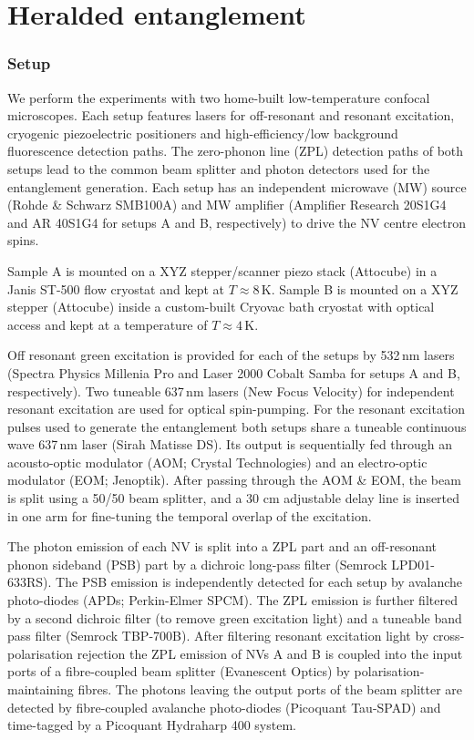 

\graphicspath{{./ch_LDE_SI/figures/}}

\chapter{Heralded entanglement}



\subsection{Setup}
We perform the experiments with two home-built low-temperature confocal microscopes. Each setup features lasers for off-resonant and resonant excitation, cryogenic piezoelectric positioners and high-efficiency/low background fluorescence detection paths. The zero-phonon line (ZPL) detection paths of both setups lead to the common beam splitter and photon detectors used for the entanglement generation. Each setup has an independent microwave (MW) source (Rohde \& Schwarz SMB100A) and MW amplifier (Amplifier Research 20S1G4 and AR 40S1G4 for setups A and B, respectively) to drive the NV centre electron spins.

Sample A is mounted on a XYZ stepper/scanner piezo stack (Attocube) in a Janis ST-500 flow cryostat and kept at $T \approx 8$\,K. Sample B is mounted on a XYZ stepper (Attocube) inside a custom-built Cryovac bath cryostat with optical access and kept at a temperature of $T \approx 4$\,K. 

Off resonant green excitation is provided for each of the setups by 532\,nm lasers (Spectra Physics Millenia Pro and Laser 2000 Cobalt Samba for setups A and B, respectively). Two tuneable 637\,nm lasers (New Focus Velocity) for independent resonant excitation are used for optical spin-pumping. For  the resonant excitation pulses used to generate the entanglement both setups share a tuneable continuous wave 637\,nm laser (Sirah Matisse DS). Its output is sequentially fed through an acousto-optic modulator (AOM; Crystal Technologies) and an electro-optic modulator (EOM; Jenoptik). After passing through the AOM \& EOM, the beam is split using a 50/50 beam splitter, and a 30 cm adjustable delay line is inserted in one arm for fine-tuning the temporal overlap of the excitation.

The photon emission of each NV is split into a ZPL part and an off-resonant phonon sideband (PSB) part by a dichroic long-pass filter (Semrock LPD01-633RS). The PSB emission is independently detected for each setup by avalanche photo-diodes (APDs; Perkin-Elmer SPCM). The ZPL emission is further filtered by a second dichroic filter (to remove green excitation light) and a tuneable band pass filter (Semrock TBP-700B). After filtering resonant excitation light by cross-polarisation rejection the ZPL emission of NVs A and B is coupled into the input ports of a fibre-coupled beam splitter (Evanescent Optics) by polarisation-maintaining fibres. The photons leaving the output ports of the beam splitter are detected by fibre-coupled avalanche photo-diodes (Picoquant Tau-SPAD) and time-tagged by a Picoquant Hydraharp 400 system.

